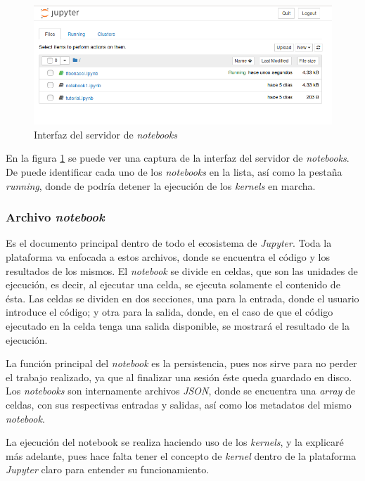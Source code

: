\documentclass[11pt,spanish,listoffigures]{tfgetsinf}
\begin{document}
\begin{figure}[h]
	\centering
  	\includegraphics[width=\linewidth]{tree.png}
  	\caption{Interfaz del servidor de \textit{notebooks}}
  	\label{fig:tree}
\end{figure}

En la figura \ref{fig:tree} se puede ver una captura de la interfaz del servidor de \textit{notebooks}. De puede identificar cada uno de los \textit{notebooks} en la lista, así como la pestaña \textit{running}, donde de podría detener la ejecución de los \textit{kernels} en marcha.


\subsubsection{Archivo \textit{notebook}}
\label{subsec:estructura-notebook}

Es el documento principal dentro de todo el ecosistema de \textit{Jupyter}. Toda la plataforma va enfocada a estos archivos, donde se encuentra el código y los resultados de los mismos. El \textit{notebook} se divide en celdas, que son las unidades de ejecución, es decir, al ejecutar una celda, se ejecuta solamente el contenido de ésta. Las celdas se dividen en dos secciones, una para la entrada, donde el usuario introduce el código; y otra para la salida, donde, en el caso de que el código ejecutado en la celda tenga una salida disponible, se mostrará el resultado de la ejecución. 

La función principal del \textit{notebook} es la persistencia, pues nos sirve para no perder el trabajo realizado, ya que al finalizar una sesión éste queda guardado en disco. Los \textit{notebooks} son internamente archivos \textit{JSON}, donde se encuentra una \textit{\gls{array}} de celdas, con sus respectivas entradas y salidas, así como los metadatos del mismo \textit{notebook}.

La ejecución del notebook se realiza haciendo uso de los \textit{kernels}, y la explicaré más adelante, pues hace falta tener el concepto de \textit{kernel} dentro de la plataforma \textit{Jupyter} claro para entender su funcionamiento.
\end{document}
